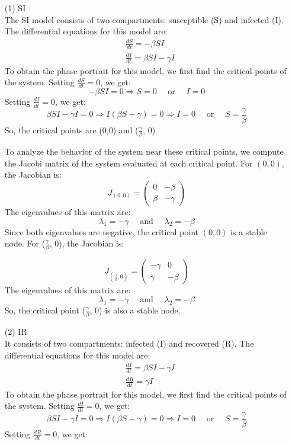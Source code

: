 \documentclass{article}
\begin{document}
\begin{enumerate}
\item[(1)] SI \\
The SI model consists of two compartments: susceptible (S) and infected (I). The differential equations for this model are:
$$
\begin{aligned}
& \frac{d S}{d t}=-\beta S I \\
& \frac{d I}{d t}=\beta S I-\gamma I
\end{aligned}
$$
To obtain the phase portrait for this model, we first find the critical points of the system. Setting $\frac{dS}{dt} = 0$, we get:
$$
-\beta S I=0 \Rightarrow S=0 \quad \text { or } \quad I=0
$$
Setting $\frac{dI}{dt} = 0$, we get:
$$
\beta S I-\gamma I=0 \Rightarrow I(\beta S-\gamma)=0 \Rightarrow I=0 \quad \text { or } \quad S=\frac{\gamma}{\beta}
$$
So, the critical points are (0,0) and ($\frac{\gamma}{\beta}$, 0).

To analyze the behavior of the system near these critical points, we compute the Jacobi matrix of the system evaluated at each critical point. For $(0,0)$, the Jacobian is:
$$
J_{(0,0)}=\left(\begin{array}{ll}
0 & -\beta \\
\beta & -\gamma
\end{array}\right)
$$
The eigenvalues of this matrix are:
$$
\lambda_1=-\gamma \quad \text { and } \quad \lambda_2=-\beta
$$
Since both eigenvalues are negative, the critical point $(0,0)$ is a stable node.
For ($\frac{\gamma}{\beta}$, 0), the Jacobian is:

$$
J_{\left(\frac{\gamma}{\beta}, 0\right)}=\left(\begin{array}{cc}
-\gamma & 0 \\
\gamma & -\beta
\end{array}\right)
$$
The eigenvalues of this matrix are:
$$
\lambda_1=-\gamma \quad \text { and } \quad \lambda_2=-\beta
$$
So, the critical point ($\frac{\gamma}{\beta}$, 0) is also a stable node.

\item[(2)] IR \\ It consists of two compartments: infected (I) and recovered (R). The differential equations for this model are:
$$
\begin{aligned}
& \frac{d I}{d t}=\beta S I-\gamma I \\
& \frac{d R}{d t}=\gamma I
\end{aligned}
$$
To obtain the phase portrait for this model, we first find the critical points of the system. Setting $\frac{dI}{dt} = 0$, we get:
$$
\beta S I-\gamma I=0 \Rightarrow I(\beta S-\gamma)=0 \Rightarrow I=0 \quad \text { or } \quad S=\frac{\gamma}{\beta}
$$
Setting $\frac{dR}{dt} = 0$, we get:


\end{enumerate}
\end{document}
